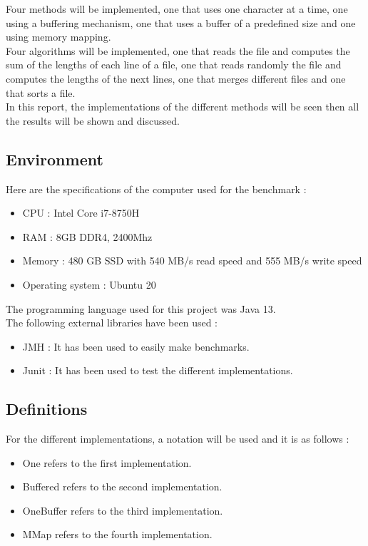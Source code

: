 \documentclass[12pt]{article}
\begin{document}
Four methods will be implemented, one that uses one character at a time, one using a buffering mechanism, one that uses a buffer of a predefined size and one using memory mapping.\\

Four algorithms will be implemented, one that reads the file and computes the sum of the lengths of each line of a file, one that reads randomly the file and computes the lengths of the next lines, one that merges different files and one that sorts a file.\\

In this report, the implementations of the different methods will be seen then all the results will be shown and discussed.
\subsection{Environment}

Here are the specifications of the computer used for the benchmark :
\begin{itemize}
    \item CPU : Intel Core i7-8750H
    \item RAM : 8GB DDR4, 2400Mhz
    \item Memory : 480 GB SSD with 540 MB/s read speed and 555 MB/s write speed
    \item Operating system : Ubuntu 20
\end{itemize}

The programming language used for this project was Java 13.\\

The following external libraries have been used :
\begin{itemize}
    \item JMH : It has been used to easily make benchmarks.
    \item Junit : It has been used to test the different implementations.
\end{itemize}

\subsection{Definitions}
For the different implementations, a notation will be used and it is as follows :
\begin{itemize}
    \item One refers to the first implementation.
    \item Buffered refers to the second implementation.
    \item OneBuffer refers to the third implementation.
    \item MMap refers to the fourth implementation.
\end{itemize}
\end{document}
